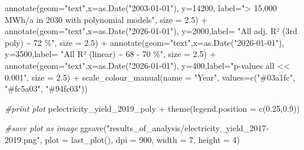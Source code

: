 \documentclass[a4paper,11pt]{article}
\newenvironment{Shaded}{\begin{snugshade}}{\end{snugshade}}
\newcommand{\AttributeTok}[1]{\textcolor[rgb]{0.77,0.63,0.00}{#1}}
\newcommand{\CommentTok}[1]{\textcolor[rgb]{0.56,0.35,0.01}{\textit{#1}}}
\newcommand{\DecValTok}[1]{\textcolor[rgb]{0.00,0.00,0.81}{#1}}
\newcommand{\FloatTok}[1]{\textcolor[rgb]{0.00,0.00,0.81}{#1}}
\newcommand{\FunctionTok}[1]{\textcolor[rgb]{0.00,0.00,0.00}{#1}}
\newcommand{\NormalTok}[1]{#1}
\newcommand{\SpecialCharTok}[1]{\textcolor[rgb]{0.00,0.00,0.00}{#1}}
\newcommand{\StringTok}[1]{\textcolor[rgb]{0.31,0.60,0.02}{#1}}
\begin{document}
\begin{Shaded}
\begin{Highlighting}[]
  \FunctionTok{annotate}\NormalTok{(}\AttributeTok{geom=}\StringTok{"text"}\NormalTok{,}\AttributeTok{x=}\FunctionTok{as.Date}\NormalTok{(}\StringTok{"2003{-}01{-}01"}\NormalTok{),}
           \AttributeTok{y=}\DecValTok{14200}\NormalTok{, }\AttributeTok{label=}\StringTok{"\textgreater{} 15,000 MWh/a in 2030 with polynomial models"}\NormalTok{, }
           \AttributeTok{size =} \FloatTok{2.5}\NormalTok{) }\SpecialCharTok{+}
  \FunctionTok{annotate}\NormalTok{(}\AttributeTok{geom=}\StringTok{"text"}\NormalTok{,}\AttributeTok{x=}\FunctionTok{as.Date}\NormalTok{(}\StringTok{"2026{-}01{-}01"}\NormalTok{),}
           \AttributeTok{y=}\DecValTok{2000}\NormalTok{,}\AttributeTok{label=} \StringTok{"All adj. R² (3rd poly) \textasciitilde{} 72 \%"}\NormalTok{, }\AttributeTok{size =} \FloatTok{2.5}\NormalTok{) }\SpecialCharTok{+}
  \FunctionTok{annotate}\NormalTok{(}\AttributeTok{geom=}\StringTok{"text"}\NormalTok{,}\AttributeTok{x=}\FunctionTok{as.Date}\NormalTok{(}\StringTok{"2026{-}01{-}01"}\NormalTok{),}
           \AttributeTok{y=}\DecValTok{3500}\NormalTok{,}\AttributeTok{label=} \StringTok{"All R² (linear) \textasciitilde{} 68 {-} 70 \%"}\NormalTok{, }\AttributeTok{size =} \FloatTok{2.5}\NormalTok{) }\SpecialCharTok{+}
  \FunctionTok{annotate}\NormalTok{(}\AttributeTok{geom=}\StringTok{"text"}\NormalTok{,}\AttributeTok{x=}\FunctionTok{as.Date}\NormalTok{(}\StringTok{"2026{-}01{-}01"}\NormalTok{),}
           \AttributeTok{y=}\DecValTok{400}\NormalTok{,}\AttributeTok{label=}\StringTok{"p{-}values all \textless{}\textless{} 0.001"}\NormalTok{, }\AttributeTok{size =} \FloatTok{2.5}\NormalTok{) }\SpecialCharTok{+}
  \FunctionTok{scale\_colour\_manual}\NormalTok{(}\AttributeTok{name =} \StringTok{"Year"}\NormalTok{, }\AttributeTok{values=}\FunctionTok{c}\NormalTok{(}\StringTok{"\#03a1fc"}\NormalTok{, }\StringTok{"\#fc5a03"}\NormalTok{, }\StringTok{"\#94fc03"}\NormalTok{)) }

\CommentTok{\#print plot}
\NormalTok{pelectricity\_yield\_2019\_poly }\SpecialCharTok{+}  \FunctionTok{theme}\NormalTok{(}\AttributeTok{legend.position =} \FunctionTok{c}\NormalTok{(}\FloatTok{0.25}\NormalTok{,}\FloatTok{0.9}\NormalTok{))}

\CommentTok{\#save plot as image}
\FunctionTok{ggsave}\NormalTok{(}\StringTok{"results\_of\_analysis/electricity\_yield\_2017{-}2019.png"}\NormalTok{,}
       \AttributeTok{plot =} \FunctionTok{last\_plot}\NormalTok{(),}
       \AttributeTok{dpi =} \DecValTok{900}\NormalTok{,}
       \AttributeTok{width =} \DecValTok{7}\NormalTok{,}
       \AttributeTok{height =} \DecValTok{4}\NormalTok{)}


\end{Highlighting}
\end{Shaded}
\end{document}

